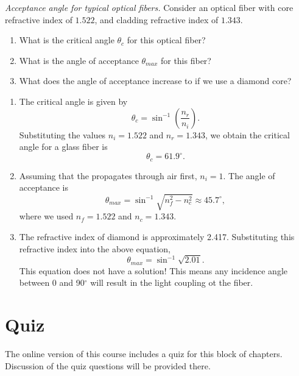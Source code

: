 \begin{exercise}
\emph{Acceptance angle for typical optical fibers.} Consider an optical fiber with core refractive index of $1.522$, and cladding refractive index of $1.343$.
\begin{enumerate}[label=(\alph*)]
    \item What is the critical angle $\theta_c$ for this optical fiber?
    \item What is the angle of acceptance $\theta_{max}$ for this fiber?
    \item What does the angle of acceptance increase to if we use a diamond core?
\end{enumerate}
\end{exercise}
\begin{solution}
\begin{enumerate}[label=(\alph*)]
    \item The critical angle is given by
    \begin{equation*}
        \theta_c = \sin^{-1}\left( \frac{n_r}{n_i} \right).
    \end{equation*}
    Substituting the values $n_i=1.522$ and $n_r=1.343$, we obtain the critical angle for a glass fiber is
    \begin{equation*}
        \theta_c = 61.9^{\circ}.
    \end{equation*}
    \item Assuming that the propagates through air first, $n_i=1$. The angle of acceptance is
    \begin{equation*}
        \theta_{max} = \sin^{-1} \sqrt{n_f^2 - n_c^2 }\approx 45.7^{\circ}, 
    \end{equation*}
    where we used $n_f=1.522$ and $n_c=1.343$.
    \item The refractive index of diamond is approximately 2.417. Substituting this refractive index into the above equation,
    \begin{equation*}
        \theta_{max} = \sin^{-1}\sqrt{2.01}.
    \end{equation*}
    This equation does not have a solution! This means any incidence angle between 0 and 90$^{\circ}$ will result in the light coupling ot the fiber.
\end{enumerate}
\end{solution}

\newpage
\section*{Quiz}
The online version of this course includes a quiz for this block of chapters.
Discussion of the quiz questions will be provided there.


